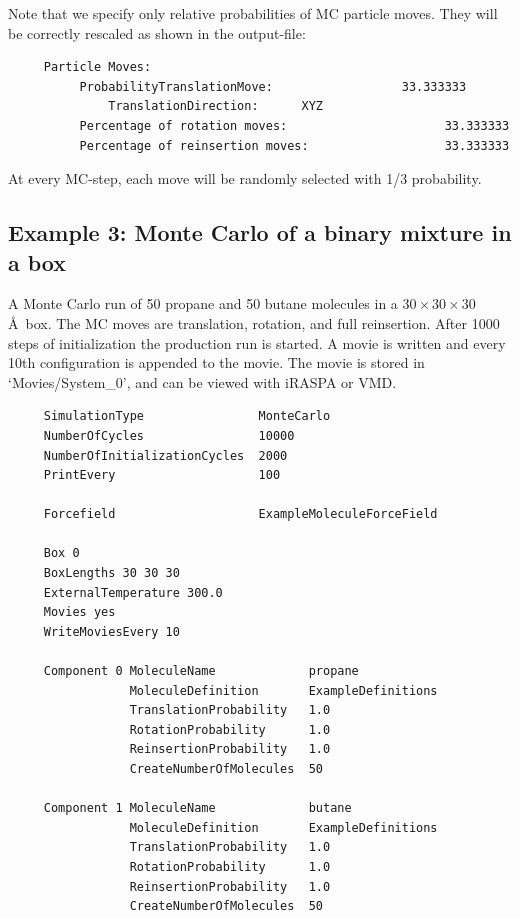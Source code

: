 Note that we specify only relative probabilities of MC particle moves. They will be correctly rescaled as shown in the output-file:
\begin{tiny}
\begin{verbatim}
     Particle Moves:
          ProbabilityTranslationMove:                  33.333333
              TranslationDirection:      XYZ
          Percentage of rotation moves:                      33.333333
          Percentage of reinsertion moves:                   33.333333
\end{verbatim}
\end{tiny}
At every MC-step, each move will be randomly selected with 1/3 probability.


\subsection*{Example 3: Monte Carlo of a binary mixture in a box}
A Monte Carlo run of 50 propane and 50 butane molecules in a $30\times30\times30$ \AA\ box. The MC moves are
translation, rotation, and full reinsertion.
After 1000 steps of initialization the production run is started.
A movie is written and every 10th configuration is appended to the movie. 
The movie is stored in `Movies/System\_0',
and can be viewed with iRASPA or VMD.

\begin{tiny}
\begin{verbatim}
     SimulationType                MonteCarlo
     NumberOfCycles                10000
     NumberOfInitializationCycles  2000
     PrintEvery                    100
     
     Forcefield                    ExampleMoleculeForceField
     
     Box 0
     BoxLengths 30 30 30
     ExternalTemperature 300.0
     Movies yes
     WriteMoviesEvery 10
     
     Component 0 MoleculeName             propane
                 MoleculeDefinition       ExampleDefinitions
                 TranslationProbability   1.0
                 RotationProbability      1.0
                 ReinsertionProbability   1.0
                 CreateNumberOfMolecules  50
     
     Component 1 MoleculeName             butane
                 MoleculeDefinition       ExampleDefinitions
                 TranslationProbability   1.0
                 RotationProbability      1.0
                 ReinsertionProbability   1.0
                 CreateNumberOfMolecules  50
\end{verbatim}
\end{tiny}

